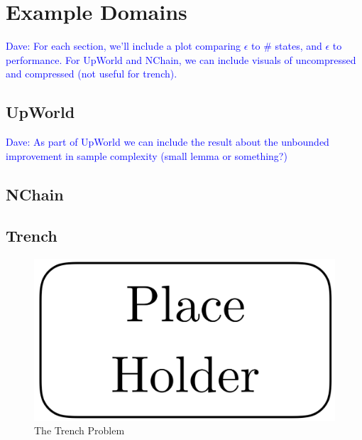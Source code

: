 \documentclass{article}
\newcommand\dnote[1]{\textcolor{blue}{Dave: #1}}
\begin{document}
\section{Example Domains}

\dnote{For each section, we'll include a plot comparing $\epsilon$ to \# states, and $\epsilon$ to performance. For UpWorld and NChain, we can include visuals of uncompressed and compressed (not useful for trench).}

\subsection{UpWorld}

\dnote{As part of UpWorld we can include the result about the unbounded improvement in sample complexity (small lemma or something?)}



\subsection{NChain}



\subsection{Trench}



\begin{figure}[h]
\centering
\includegraphics[width=0.42\columnwidth]{figures/placeholder.png}
\caption{The Trench Problem}
\label{fig:trench}
\end{figure}
\end{document}
